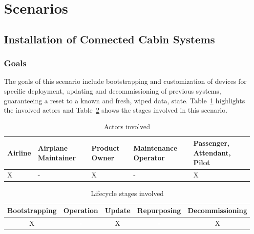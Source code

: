 \section{Scenarios}

\subsection{Installation of Connected Cabin Systems} %
\label{sub:Installation of Connected Cabin Systems}

\subsubsection{Goals}

The goals of this scenario include bootstrapping and customization of devices for specific deployment, updating and
decommissioning of previous systems, guaranteeing a reset to a known and fresh, wiped data, state.
Table~\ref{tab:Actors involved} highlights the involved actors and Table~\ref{tab:Lifecycle stages involved} shows the
stages involved in this scenario.

\begin{table}
	\caption{Actors involved}
	\label{tab:Actors involved}
	\begin{center}
		\begin{tabular}{ |p{2.5cm}|p{2.5cm}|p{2.5cm}|p{2.5cm}|p{2.5cm}| }
			\hline
			Airline & Airplane Maintainer & Product Owner & Maintenance Operator & Passenger, Attendant, Pilot \\
			\hline
			X       & -                   & X             & -                    & X                           \\
			\hline
		\end{tabular}
	\end{center}
\end{table}

\begin{table}
	\caption{Lifecycle stages involved}
	\label{tab:Lifecycle stages involved}
	\begin{center}
		\begin{tabular}{ |c|c|c|c|c| }
			\hline
			Bootstrapping & Operation & Update & Repurposing & Decommissioning \\
			\hline
			X             & -         & X      & -           & X               \\
			\hline
		\end{tabular}
	\end{center}
\end{table}

